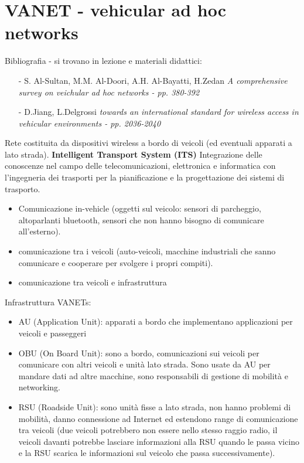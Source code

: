 \documentclass[12pt,italian]{report}
\begin{document}
\chapter{VANET - vehicular ad hoc networks}
Bibliografia - si trovano in lezione e materiali didattici: 
\begin{itemize}
    \item[-]S. Al-Sultan, M.M. Al-Doori, A.H. Al-Bayatti, H.Zedan
    \textit{A comprehensive survey on veichular ad hoc networks - pp. 380-392}
    \item[-]D.Jiang, L.Delgrossi
    \textit{towards an international standard for wireless access in vehicular environments - pp. 2036-2040}
\end{itemize}
Rete costituita da dispositivi wireless a bordo di veicoli (ed eventuali apparati a lato strada). 
\bigbreak
\noindent \textbf{Intelligent Transport System (ITS)} 
\bigbreak
\noindent Integrazione delle conoscenze nel campo delle telecomunicazioni, elettronica e informatica con l'ingegneria dei trasporti per la pianificazione e la progettazione dei sistemi di trasporto.
\begin{itemize}
    \item Comunicazione in-vehicle (oggetti sul veicolo: sensori di parcheggio, altoparlanti bluetooth, sensori che non hanno bisogno di comunicare all'esterno).
    \item comunicazione tra i veicoli (auto-veicoli, macchine industriali che sanno comunicare e cooperare per svolgere i propri compiti). 
    \item comunicazione tra veicoli e infrastruttura 
\end{itemize}
Infrastruttura VANETs:
\begin{itemize}
    \item AU (Application Unit): apparati a bordo che implementano applicazioni per veicoli e passeggeri 
    \item OBU (On Board Unit): sono a bordo, comunicazioni sui veicoli per comunicare con altri veicoli e unità lato strada. Sono usate da AU per mandare dati ad altre macchine, sono responsabili di gestione di mobilità e networking. 
    \item RSU (Roadside Unit): sono unità fisse a lato strada, non hanno problemi di mobilità, danno connessione ad Internet ed estendono range di comunicazione tra veicoli (due veicoli potrebbero non essere nello stesso raggio radio, il veicoli davanti potrebbe lasciare informazioni alla RSU quando le passa vicino e la RSU scarica le informazioni sul veicolo che passa successivamente). 
\end{itemize}
\end{document}
